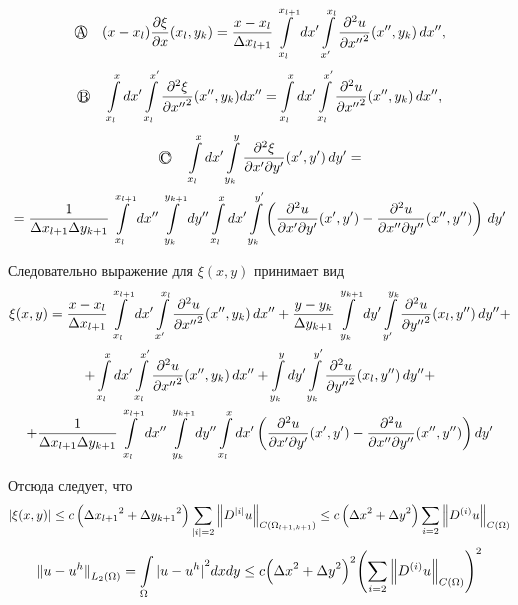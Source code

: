 \[\raisebox{.5pt}{\textcircled{\raisebox{-.9pt} {A}}} \quad (x - x_l) \frac{\partial \xi}{\partial x}(x_l, y_k) = \frac{x - x_l}{\Delta x_{l+1}}
\Int_{x_l}^{x_{l+1}} dx' \Int_{x'}^{x_l} \frac{\partial^2 u}{{\partial x''}^2}(x'', y_k) \, dx'',\]
\[\raisebox{.5pt}{\textcircled{\raisebox{-1.5pt} {B}}} \quad \Int_{x_l}^x dx' \Int_{x_l}^{x'} \frac{\partial^2 \xi}{{\partial x''}^2}(x'', y_k) dx'' = 
\Int_{x_l}^x dx' \Int_{x_l}^{x'} \frac{\partial^2 u}{{\partial x''}^2}(x'', y_k) \, dx'',\]
\begin{multline*}
	\raisebox{.5pt}{\textcircled{\raisebox{-1.5pt} {C}}}
	\quad \Int_{x_l}^x dx' \Int_{y_k}^y \frac{\partial^2 \xi}{\partial x' \partial y'}(x', y') \, dy' = \\
	= \frac{1}{\Delta x_{l+1} \Delta y_{k+1}} \Int_{x_l}^{x_{l+1}} dx'' \Int_{y_k}^{y_{k+1}} dy'' \Int_{x_l}^x dx' \Int_{y_k}^{y'} \left( \frac{\partial^2 u}{\partial x' \partial y'}(x', y') - \frac{\partial^2 u}{\partial x'' \partial y''}(x'', y'') \right) \, dy'
\end{multline*}

Следовательно выражение для $\xi (x,y)$ принимает вид
\begin{multline*}
	\xi(x, y) = \frac{x - x_l}{\Delta x_{l+1}} \int\limits_{x_l}^{x_{l+1}} dx' \int\limits_{x'}^{x_l} \frac{\partial^2 u}{{\partial x''}^2}(x'', y_k) \, dx'' + \frac{y - y_k}{\Delta y_{k+1}} \int\limits_{y_k}^{y_{k+1}} dy' \int\limits_{y'}^{y_k} \frac{\partial^2 u}{{\partial y''}^2}(x_l, y'') \, dy'' + \\
	+ \int\limits_{x_l}^x dx' \int\limits_{x_l}^{x'} \frac{\partial^2 u}{{\partial x''}^2}(x'', y_k) \, dx'' + \int\limits_{y_k}^y dy' \int\limits_{y_k}^{y'} \frac{\partial^2 u}{{\partial y''}^2}(x_l, y'') \, dy'' + \\ 
	+ \frac{1}{\Delta x_{l+1} \Delta y_{k+1}} \int\limits_{x_l}^{x_{l+1}} dx'' \int\limits_{y_k}^{y_{k+1}} dy'' \int\limits_{x_l}^x dx' \left( \frac{\partial^2 u}{\partial x' \partial y'}(x', y') - \frac{\partial^2 u}{\partial x'' \partial y''}(x'', y'') \right) dy'
\end{multline*}

Отсюда следует, что
\[ | \xi (x,y) | \leq c \left( {\Delta x_{l+1}}^2 + {\Delta y_{k+1}}^2 \right) \sum\limits_{|i|=2} {\left\| D^{|i|} u \right\|}_{C(\Omega_{l+1, k+1})} \leq c \left( {\Delta x}^2 + {\Delta y}^2 \right) \sum\limits_{i=2} {\left\| D^{(i)} u \right\|}_{C(\Omega)} \]
\[ {\| u - u^h \|}_{L_2(\Omega)} = \int\limits_{\Omega} {| u - u^h |}^2 dx dy \leq c {\left( {\Delta x}^2 + {\Delta y}^2 \right)}^2 {\left( \sum\limits_{i=2} {\left\| D^{(i)} u \right\|}_{C(\Omega)} \right)}^2 \]

